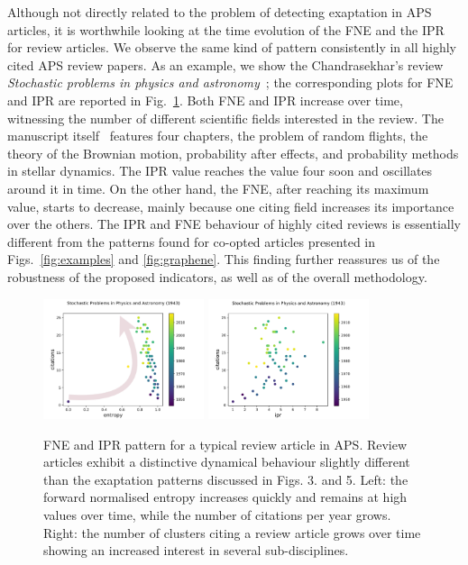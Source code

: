 \documentclass[draft,final]{vutinfth} %
\begin{document}
Although not directly related to the problem of detecting exaptation in APS articles, it is worthwhile looking at the time evolution of the FNE and the IPR for review articles. We observe the same kind of pattern consistently in all highly cited APS review papers. As an example, we show the Chandrasekhar's review \emph{Stochastic problems in physics and astronomy}~\cite{review1943}; the corresponding plots for FNE and IPR are reported in Fig.~\ref{fig:review}.
Both FNE and IPR increase over time, witnessing the number of different scientific fields interested in the review. The manuscript itself~\cite{review1943} features four chapters, the problem of random flights, the theory of the Brownian motion, probability after effects, and probability methods in stellar dynamics. The IPR  value reaches the value four soon and oscillates around it in time. On the other hand, the FNE, after reaching its maximum value, starts to decrease, mainly because one citing field increases its importance over the others. The IPR and FNE behaviour of highly cited reviews is essentially different from the patterns found for co-opted articles presented in Figs.~\ref{fig:examples} and \ref{fig:graphene}. This finding further reassures us of the robustness of the proposed indicators, as well as of the overall methodology. 
%
\begin{figure}[t]
  \centering
  \includegraphics[width=0.42\textwidth]{figures_exaptation/review-entropy.pdf}%
  \includegraphics[width=0.42\textwidth]{figures_exaptation/review-ipr.pdf}
\caption{FNE and IPR pattern for a typical review article in APS. Review articles exhibit a distinctive dynamical behaviour slightly different than the exaptation patterns discussed in Figs. 3. and 5. Left: the forward normalised entropy increases quickly and remains at high values over time, while the number of citations per year grows. Right:  the number of clusters citing a review article grows over time showing an increased interest in several sub-disciplines.}
  \label{fig:review}
\end{figure}
\end{document}

